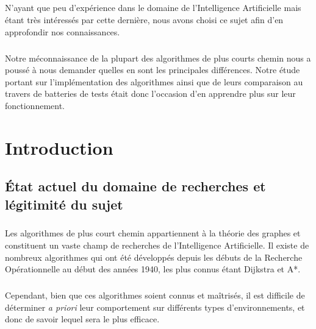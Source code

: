 \documentclass[pidr]{tnreport}
\begin{document}
\paragraph{}
N'ayant que peu d'expérience dans le domaine de l'Intelligence Artificielle mais étant très intéressés par cette dernière, nous avons choisi ce sujet afin d'en approfondir nos connaissances. 

\paragraph{}
Notre méconnaissance de la plupart des algorithmes de plus courts chemin nous a poussé à nous demander quelles en sont les principales différences. Notre étude portant sur l'implémentation des algorithmes ainsi que de leurs comparaison au travers de batteries de tests était donc l'occasion d'en apprendre plus sur leur fonctionnement.

\clearpage

\renewcommand{\baselinestretch}{0.5}\normalsize
\tableofcontents
\renewcommand{\baselinestretch}{1.0}\normalsize
\clearpage

\setcounter{page}{1}

\chapter{Introduction}

	\section{État actuel du domaine de recherches et légitimité du sujet}

\paragraph{}
Les algorithmes de plus court chemin appartiennent à la théorie des graphes et constituent un vaste champ de recherches de l'Intelligence Artificielle. Il existe de nombreux algorithmes qui ont été développés depuis les débuts de la Recherche Opérationnelle au début des années 1940, les plus connus étant Dijkstra et A*.

\paragraph{}
Cependant, bien que ces algorithmes soient connus et maîtrisés, il est difficile de déterminer \textit{a priori} leur comportement sur différents types d'environnements, et donc de savoir lequel sera le plus efficace. \newline
\end{document}
